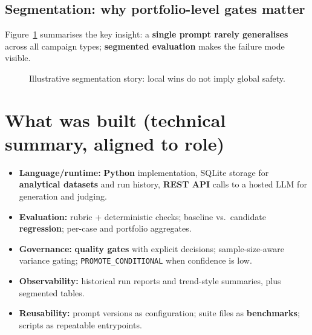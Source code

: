 \documentclass[11pt,a4paper]{article}
\newcommand{\JD}[1]{\colorbox{KwFill}{\textbf{\small #1}}}
\begin{document}
\subsection{Segmentation: why portfolio-level gates matter}
Figure~\ref{fig:segment} summarises the key insight: a \textbf{single prompt rarely generalises} across all campaign types; \JD{segmented evaluation} makes the failure mode visible.

\begin{figure}[htbp]
\centering
{}
\caption{Illustrative segmentation story: local wins do not imply global safety.}
\label{fig:segment}
\end{figure}

\section{What was built (technical summary, aligned to role)}
\begin{itemize}
  \item \textbf{Language/runtime:} \JD{Python} implementation, SQLite storage for \JD{analytical datasets} and run history, \JD{REST API} calls to a hosted LLM for generation and judging.
  \item \textbf{Evaluation:} rubric + deterministic checks; baseline vs.\ candidate \JD{regression}; per-case and portfolio aggregates.
  \item \textbf{Governance:} \JD{quality gates} with explicit decisions; sample-size-aware variance gating; \texttt{PROMOTE\_CONDITIONAL} when confidence is low.
  \item \textbf{Observability:} historical run reports and trend-style summaries, plus segmented tables.
  \item \textbf{Reusability:} prompt versions as configuration; suite files as \JD{benchmarks}; scripts as repeatable entrypoints.
\end{itemize}
\end{document}
